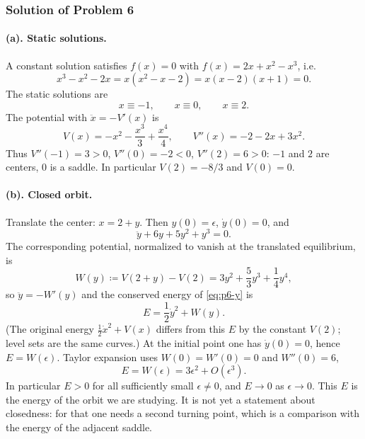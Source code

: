 \documentclass[11pt,a4paper]{article}
\begin{document}
\subsubsection{Solution of Problem 6}

\paragraph{(a). Static solutions.}

A constant solution satisfies \(f(x)=0\) with \(f(x)=2x+x^{2}-x^{3}\), i.e.
\[
x^{3}-x^{2}-2x=x(x^{2}-x-2)=x(x-2)(x+1)=0.
\]
The static solutions are
\[
x\equiv -1,\qquad x\equiv 0,\qquad x\equiv 2.
\]
The potential with \(\ddot x=-V'(x)\) is
\[
V(x)=-x^{2}-\frac{x^{3}}{3}+\frac{x^{4}}{4},
\qquad
V''(x)=-2-2x+3x^{2}.
\]
Thus \(V''(-1)=3>0\), \(V''(0)=-2<0\), \(V''(2)=6>0\): \(-1\) and \(2\) are centers, \(0\) is a saddle. In particular \(V(2)=-8/3\) and \(V(0)=0\).

\paragraph{(b). Closed orbit.}

Translate the center: \(x=2+y\). Then \(y(0)=\epsilon\), \(\dot y(0)=0\), and
\begin{equation}
\label{eq:p6-y}
\ddot y+6y+5y^{2}+y^{3}=0.
\end{equation}
The corresponding potential, normalized to vanish at the translated equilibrium, is
\[
W(y)
\coloneqq
V(2+y)-V(2)
=
3y^{2}+\frac53 y^{3}+\frac14 y^{4},
\]
so \(\ddot y=-W'(y)\) and the conserved energy of \eqref{eq:p6-y} is
\[
E
=
\frac12\dot y^{2}+W(y).
\]
(The original energy \(\frac12\dot x^{2}+V(x)\) differs from this \(E\) by the constant \(V(2)\); level sets are the same curves.) At the initial point one has \(\dot y(0)=0\), hence \(E=W(\epsilon)\). Taylor expansion uses \(W(0)=W'(0)=0\) and \(W''(0)=6\),
\[
E=W(\epsilon)=3\epsilon^{2}+O(\epsilon^{3}).
\]
In particular \(E>0\) for all sufficiently small \(\epsilon\neq 0\), and \(E\to 0\) as \(\epsilon\to 0\). This \(E\) is the energy of the orbit we are studying. It is not yet a statement about closedness: for that one needs a second turning point, which is a comparison with the energy of the adjacent saddle.
\end{document}
